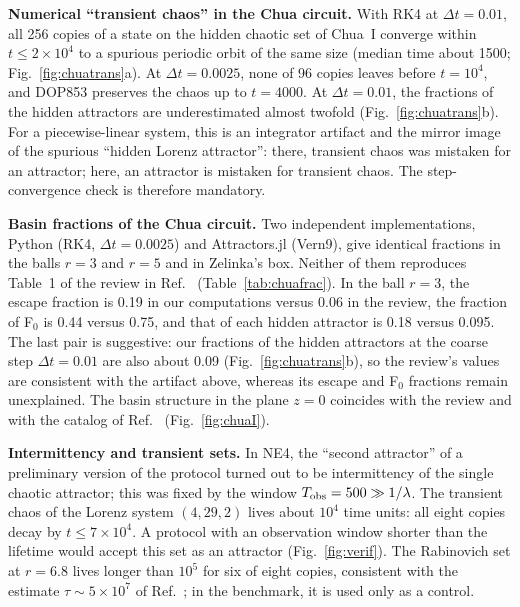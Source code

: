 \textbf{Numerical ``transient chaos'' in the Chua circuit.} With RK4 at $\Delta t=0.01$, all 256 copies of a state on the hidden chaotic set of Chua~I converge within $t\le2\times10^4$ to a spurious periodic orbit of the same size (median time about 1500; Fig.~\ref{fig:chuatrans}a). At $\Delta t=0.0025$, none of 96 copies leaves before $t=10^4$, and DOP853 preserves the chaos up to $t=4000$. At $\Delta t=0.01$, the fractions of the hidden attractors are underestimated almost twofold (Fig.~\ref{fig:chuatrans}b). For a piecewise-linear system, this is an integrator artifact and the mirror image of the spurious ``hidden Lorenz attractor'':\cite{Munmuangsaen2018,SprottMunmuangsaen2018Comment} there, transient chaos was mistaken for an attractor; here, an attractor is mistaken for transient chaos. The step-convergence check is therefore mandatory.

\textbf{Basin fractions of the Chua circuit.} Two independent implementations, Python (RK4, $\Delta t=0.0025$) and Attractors.jl (Vern9), give identical fractions in the balls $r=3$ and $r=5$ and in Zelinka's box. Neither of them reproduces Table~1 of the review in Ref.~ (Table~\ref{tab:chuafrac}). In the ball $r=3$, the escape fraction is 0.19 in our computations versus 0.06 in the review, the fraction of F$_0$ is 0.44 versus 0.75, and that of each hidden attractor is 0.18 versus 0.095. The last pair is suggestive: our fractions of the hidden attractors at the coarse step $\Delta t=0.01$ are also about 0.09 (Fig.~\ref{fig:chuatrans}b), so the review's values are consistent with the artifact above, whereas its escape and F$_0$ fractions remain unexplained. The basin structure in the plane $z=0$ coincides with the review and with the catalog of Ref.~ (Fig.~\ref{fig:chuaI}).

\textbf{Intermittency and transient sets.} In NE4, the ``second attractor'' of a preliminary version of the protocol turned out to be intermittency of the single chaotic attractor; this was fixed by the window $T_{\rm obs}=500\gg1/\lambda$. The transient chaos of the Lorenz system $(4,29,2)$ lives about $10^4$ time units: all eight copies decay by $t\le7\times10^4$. A protocol with an observation window shorter than the lifetime would accept this set as an attractor (Fig.~\ref{fig:verif}). The Rabinovich set at $r=6.8$ lives longer than $10^5$ for six of eight copies, consistent with the estimate $\tau\sim5\times10^7$ of Ref.~; in the benchmark, it is used only as a control.

